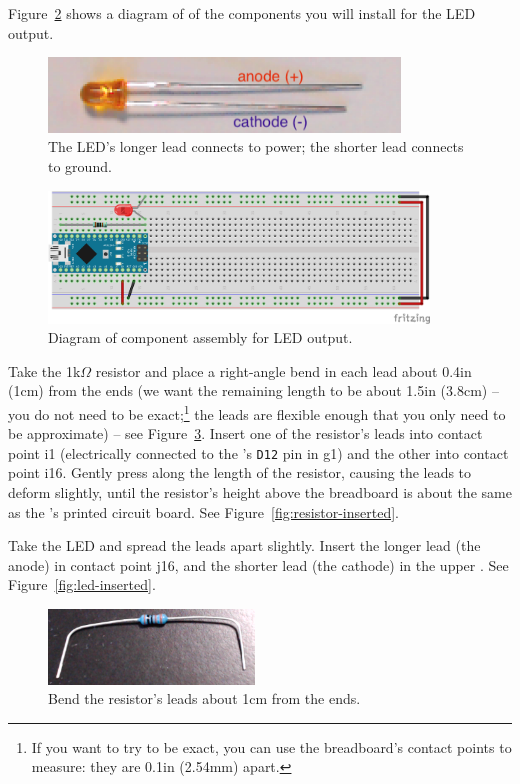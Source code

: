 Figure~\ref{fig:led-diagram} shows a diagram of of the components you will
install for the LED output.

\begin{figure}
    \centering
    \includegraphics[height=2cm]{led-annotated}
    \caption{The LED's longer lead connects to power; the shorter lead connects
        to ground.\label{fig:led-annotated}}
\end{figure}

\begin{figure}
    \centering
    \includegraphics[width=0.9\textwidth]{fritzing_images/led}
    \caption{Diagram of component assembly for LED output.
        \label{fig:led-diagram}}
\end{figure}

Take the 1k$\Omega$ resistor and place a right-angle bend in each lead about
0.4in (1cm) from the ends (we want the remaining length to be about 1.5in
(3.8cm) -- you do not need to be exact;\footnote{If you want to try to be
exact, you can use the breadboard's contact points to measure: they are 0.1in
(2.54mm) apart.} the leads are flexible enough that you only need to be
approximate) -- see Figure~\ref{fig:resistor-bent}. Insert one of the resistor's
leads into contact point i1 (electrically connected to the \nano's \texttt{D12}
pin in g1) and the other into contact point i16. Gently press along the length
of the resistor, causing the leads to deform slightly, until the resistor's
height above the breadboard is about the same as the \nano's printed circuit
board. See Figure~\ref{fig:resistor-inserted}.

Take the LED and spread the leads apart slightly. Insert the longer lead (the
anode) in contact point j16, and the shorter lead (the cathode) in the upper
\ground. See Figure~\ref{fig:led-inserted}.

\begin{figure}
    \centering
    \includegraphics[height=2cm]{resistor-bent}
    \caption{Bend the resistor's leads about 1cm from the ends.\label{fig:resistor-bent}}
\end{figure}

